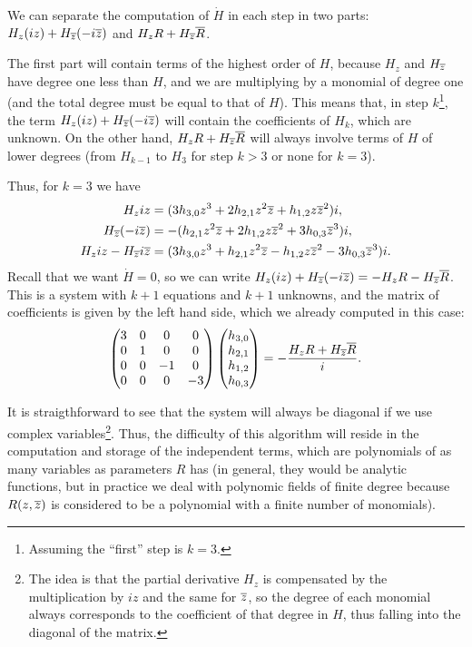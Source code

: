 We can separate the computation of $\dot H$ in each step in two parts: $H_z(iz)+H_{\overline{z}}(-i{\overline{z}})$ and $H_z R+H_{\overline{z}}\overline R$.
\begin{observacio}
The first part will contain terms of the highest order of $H$, because $H_z$ and $H_{\overline{z}}$ have degree one less than $H$, and we are multiplying by a monomial of degree one (and the total degree must be equal to that of $H$). This means that, in step $k$\footnote{Assuming the ``first'' step is $k=3$.}, the term $H_z(iz)+H_{\overline{z}}(-i{\overline{z}})$ will contain the coefficients of $H_k$, which are unknown. On the other hand, $H_z R+H_{\overline{z}}\overline R$ will always involve terms of $H$ of lower degrees (from $H_{k-1}$ to $H_3$ for step $k>3$ or none for $k=3$).
\end{observacio}

Thus, for $k=3$ we have
\begin{align*}
H_z iz &= (3h_{3,0}z^3+2h_{2,1}z^2{\overline{z}}+h_{1,2}z{\overline{z}}^2)i,\\
H_{\overline{z}} (-i{\overline{z}}) &= -(h_{2,1}z^2{\overline{z}}+2h_{1,2}z{\overline{z}}^2+3h_{0,3}{\overline{z}}^3)i,\\
H_z iz - H_{\overline{z}} i{\overline{z}} &= (3h_{3,0}z^3+h_{2,1}z^2{\overline{z}}-h_{1,2}z{\overline{z}}^2-3h_{0,3}{\overline{z}}^3)i.
\end{align*}
Recall that we want $\dot H=0$, so we can write $H_z(iz)+H_{\overline{z}}(-i{\overline{z}})=-H_z R-H_{\overline{z}}\overline R$. This is a system with $k+1$ equations and $k+1$ unknowns, and the matrix of coefficients is given by the left hand side, which we already computed in this case:
\begin{align*}
\begin{pmatrix}
3 & 0 & 0 & 0\\
0 & 1 & 0 & 0\\
0 & 0 & -1 & 0\\
0 & 0 & 0 & -3\\
\end{pmatrix}
\begin{pmatrix}
h_{3,0}\\h_{2,1}\\h_{1,2}\\h_{0,3}\\
\end{pmatrix} = -\frac{H_z R+H_{\overline{z}}\overline R}{i}.
\end{align*}

It is straigthforward to see that the system will always be diagonal if we use complex variables\footnote{The idea is that the partial derivative $H_z$ is compensated by the multiplication by $iz$ and the same for ${\overline{z}}$, so the degree of each monomial always corresponds to the coefficient of that degree in $H$, thus falling into the diagonal of the matrix.}. Thus, the difficulty of this algorithm will reside in the computation and storage of the independent terms, which are polynomials of as many variables as parameters $R$ has \parencite{Dumortier2006} (in general, they would be analytic functions, but in practice we deal with polynomic fields of finite degree because $R(z,\overline{z})$ is considered to be a polynomial with a finite number of monomials).

